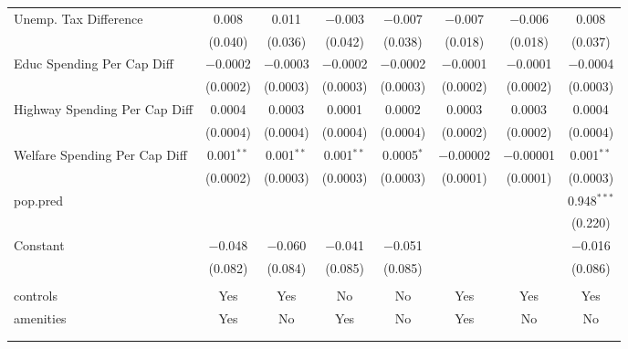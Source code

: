 \begin{table}[!htbp]
\begin{tabular}{@{\extracolsep{5pt}}lccccccc}
  Unemp. Tax Difference & 0.008 & 0.011 & $-$0.003 & $-$0.007 & $-$0.007 & $-$0.006 & 0.008 \\ 
  & (0.040) & (0.036) & (0.042) & (0.038) & (0.018) & (0.018) & (0.037) \\ 
  Educ Spending Per Cap Diff & $-$0.0002 & $-$0.0003 & $-$0.0002 & $-$0.0002 & $-$0.0001 & $-$0.0001 & $-$0.0004 \\ 
  & (0.0002) & (0.0003) & (0.0003) & (0.0003) & (0.0002) & (0.0002) & (0.0003) \\ 
  Highway Spending Per Cap Diff & 0.0004 & 0.0003 & 0.0001 & 0.0002 & 0.0003 & 0.0003 & 0.0004 \\ 
  & (0.0004) & (0.0004) & (0.0004) & (0.0004) & (0.0002) & (0.0002) & (0.0004) \\ 
  Welfare Spending Per Cap Diff & 0.001$^{**}$ & 0.001$^{**}$ & 0.001$^{**}$ & 0.0005$^{*}$ & $-$0.00002 & $-$0.00001 & 0.001$^{**}$ \\ 
  & (0.0002) & (0.0003) & (0.0003) & (0.0003) & (0.0001) & (0.0001) & (0.0003) \\ 
  pop.pred &  &  &  &  &  &  & 0.948$^{***}$ \\ 
  &  &  &  &  &  &  & (0.220) \\ 
  Constant & $-$0.048 & $-$0.060 & $-$0.041 & $-$0.051 &  &  & $-$0.016 \\ 
  & (0.082) & (0.084) & (0.085) & (0.085) &  &  & (0.086) \\ 
 \hline \\[-1.8ex] 
controls & Yes & Yes & No & No & Yes & Yes & Yes \\ 
amenities & Yes & No & Yes & No & Yes & No & No \\ 
\hline \\[-1.8ex] 
\hline 
\hline \\[-1.8ex] 
\end{tabular} 
\end{table} 
